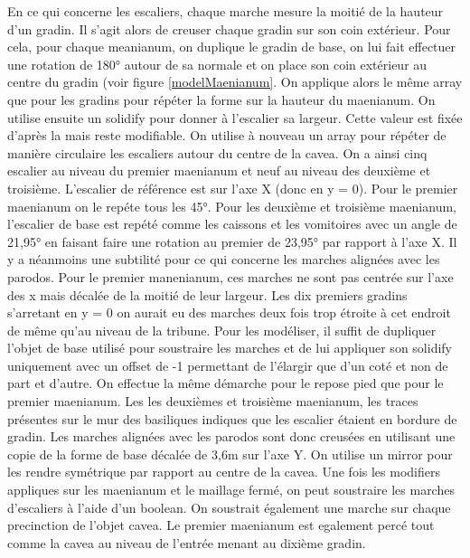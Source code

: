 En ce qui concerne les escaliers, chaque marche mesure la moitié de la hauteur d'un gradin. Il s'agit alors de creuser chaque gradin sur son coin extérieur. Pour cela, pour chaque meanianum, on duplique le gradin de base, on lui fait effectuer une rotation de 180° autour de sa normale et on place son coin extérieur au centre du gradin (voir figure \ref{modelMaenianum}. On applique alors le même \gls{array} que pour les gradins pour répéter la forme sur la hauteur du maenianum. On utilise ensuite un \gls{solidify} pour donner à l'escalier sa largeur. Cette valeur est fixée d'après la \cite[Pl. XIX]{orangePl} mais reste modifiable. On utilise à nouveau un \gls{array} pour répéter de manière circulaire les escaliers autour du centre de la cavea. On a ainsi cinq escalier au niveau du premier maenianum et neuf au niveau des deuxième et troisième. L'escalier de référence est sur l'axe X (donc en y = 0). Pour le premier maenianum on le repéte tous les 45°. Pour les deuxième et troisième maenianum, l'escalier de base est repété comme les caissons et les vomitoires avec un angle de 21,95° en faisant faire une rotation au premier de 23,95° par rapport à l'axe X. Il y a néanmoins une subtilité pour ce qui concerne les marches alignées avec les \gls{parodos}. Pour le premier manenianum, ces marches ne sont pas centrée sur l'axe des x mais décalée de la moitié de leur largeur. Les dix premiers gradins s'arretant en y = 0 on aurait eu des marches deux fois trop étroite à cet endroit de même qu'au niveau de la tribune. Pour les modéliser, il suffit de dupliquer l'objet de base utilisé pour soustraire les marches et de lui appliquer son \gls{solidify} uniquement avec un offset de -1 permettant de l'élargir que d'un coté et non de part et d'autre. On effectue la même démarche pour le repose pied que pour le premier maenianum. Les les deuxièmes et troisième maenianum, les traces présentes sur le mur des basiliques indiques que les escalier étaient en bordure de gradin. Les marches alignées avec les \gls{parodos} sont donc creusées en utilisant une copie de la forme de base décalée de 3,6m sur l'axe Y. On utilise un \gls{mirror} pour les rendre symétrique par rapport au centre de la cavea.
Une fois les modifiers appliques sur les maenianum et le maillage fermé, on peut soustraire les marches d'escaliers à l'aide d'un \gls{boolean}. On soustrait également une marche sur chaque precinction de l'objet cavea. Le premier maenianum est egalement percé tout comme la cavea au niveau de l'entrée menant au dixième gradin.


